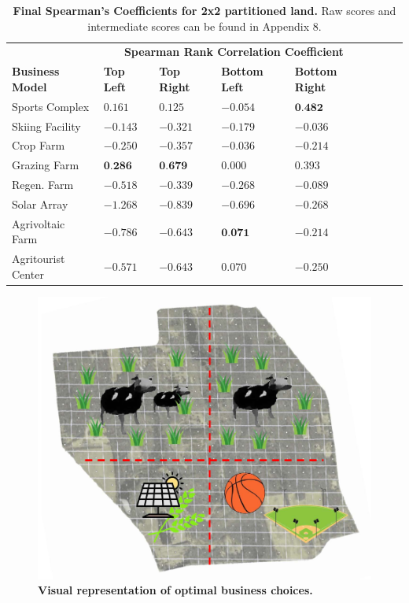 \documentclass{mcmthesis}
\begin{document}
\begin{table}[!htbp]
    \begin{tabularx}{\textwidth}{XlXlXlXl}
        \toprule
        & \multicolumn{4}{c}{\textbf{Spearman Rank Correlation Coefficient}} 
        \\
        \textbf{Business Model} & \textbf{Top Left} & \textbf{Top Right} & \textbf{Bottom Left} & \textbf{Bottom Right}\\
        \midrule
        Sports Complex & $0.161$ & $0.125$ & $-0.054$ & $\textbf{0.482}$ \\
        Skiing Facility & $-0.143$ & $-0.321$ & $-0.179$ & $-0.036$ \\
        Crop Farm & $-0.250$ & $-0.357$ & $-0.036$ & $-0.214$ \\
        Grazing Farm & $\textbf{0.286}$ & $\textbf{0.679}$ & $0.000$ & $0.393$ \\
        Regen. Farm & $-0.518$ & $-0.339$ & $-0.268$ & $-0.089$ \\
        Solar Array & $-1.268$ & $-0.839$ & $-0.696$ & $-0.268$ \\
        Agrivoltaic Farm & $-0.786$ & $-0.643$ & $\textbf{0.071}$ & $-0.214$ \\
        Agritourist Center & $-0.571$ & $-0.643$ & $0.070$ & $-0.250$ \\
        \bottomrule
    \end{tabularx}
    \caption{\textbf{Final Spearman's Coefficients for 2x2 partitioned land.} Raw scores and intermediate scores can be found in Appendix 8.}
    \label{tab:spearman2x2}
\end{table}

\begin{figure}[!htbp]
    \centering
    \includegraphics[scale=0.3]{figures/2x2businesschoice.pdf}
    \caption{\textbf{Visual representation of optimal business choices.}}
    \label{fig:businessallocation2x2}
\end{figure}
\end{document}
